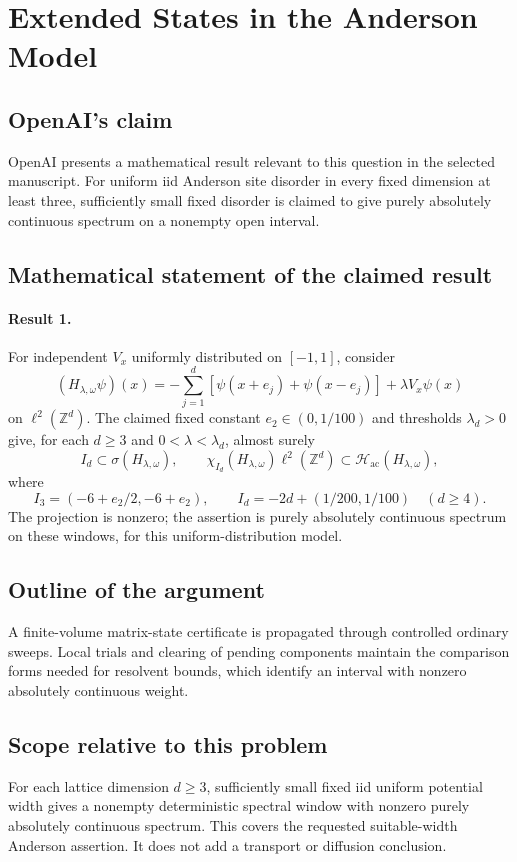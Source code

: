 \documentclass[11pt]{article}
\begin{document}
\section*{Extended States in the Anderson Model}

\subsection{OpenAI's claim}
OpenAI presents a mathematical result relevant to this question in the selected manuscript. For uniform iid Anderson site disorder in every fixed dimension at least three, sufficiently small fixed disorder is claimed to give purely absolutely continuous spectrum on a nonempty open interval.

\subsection{Mathematical statement of the claimed result}
\paragraph{Result 1.} For independent \(V_x\) uniformly distributed on \([-1,1]\), consider
\[
 (H_{\lambda,\omega}\psi)(x)=-\sum_{j=1}^d[\psi(x+e_j)+\psi(x-e_j)]+\lambda V_x\psi(x)
\]
on \(\ell^2(\mathbb Z^d)\). The claimed fixed constant \(e_2\in(0,1/100)\) and thresholds \(\lambda_d>0\) give, for each \(d\ge3\) and \(0<\lambda<\lambda_d\), almost surely
\[
 I_d\subset\sigma(H_{\lambda,\omega}),\qquad
 \chi_{I_d}(H_{\lambda,\omega})\ell^2(\mathbb Z^d)\subset\mathcal H_{\mathrm{ac}}(H_{\lambda,\omega}),
\]
where
\[
 I_3=(-6+e_2/2,-6+e_2),\qquad
 I_d=-2d+(1/200,1/100)\quad(d\ge4).
\]
The projection is nonzero; the assertion is purely absolutely continuous spectrum on these windows, for this uniform-distribution model.

\subsection{Outline of the argument}
A finite-volume matrix-state certificate is propagated through controlled ordinary sweeps. Local trials and clearing of pending components maintain the comparison forms needed for resolvent bounds, which identify an interval with nonzero absolutely continuous weight.

\subsection{Scope relative to this problem}
For each lattice dimension $d\ge3$, sufficiently small fixed iid uniform potential width gives a nonempty deterministic spectral window with nonzero purely absolutely continuous spectrum. This covers the requested suitable-width Anderson assertion. It does not add a transport or diffusion conclusion.
\end{document}
